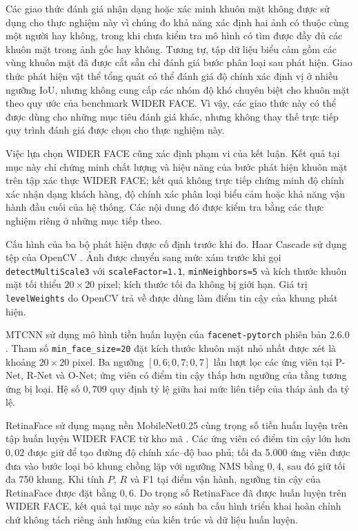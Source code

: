 \documentclass[../LuanVan.tex]{subfiles}
\begin{document}
Các giao thức đánh giá nhận dạng hoặc xác minh khuôn mặt không được sử dụng cho thực nghiệm này vì chúng đo khả năng xác định hai ảnh có thuộc cùng một người hay không, trong khi chưa kiểm tra mô hình có tìm được đầy đủ các khuôn mặt trong ảnh gốc hay không. Tương tự, tập dữ liệu biểu cảm gồm các vùng khuôn mặt đã được cắt sẵn chỉ đánh giá bước phân loại sau phát hiện. Giao thức phát hiện vật thể tổng quát có thể đánh giá độ chính xác định vị ở nhiều ngưỡng IoU, nhưng không cung cấp các nhóm độ khó chuyên biệt cho khuôn mặt theo quy ước của benchmark WIDER FACE. Vì vậy, các giao thức này có thể được dùng cho những mục tiêu đánh giá khác, nhưng không thay thế trực tiếp quy trình đánh giá được chọn cho thực nghiệm này.

Việc lựa chọn WIDER FACE cũng xác định phạm vi của kết luận. Kết quả tại mục này chỉ chứng minh chất lượng và hiệu năng của bước phát hiện khuôn mặt trên tập xác thực WIDER FACE; kết quả không trực tiếp chứng minh độ chính xác nhận dạng khách hàng, độ chính xác phân loại biểu cảm hoặc khả năng vận hành đầu cuối của hệ thống. Các nội dung đó được kiểm tra bằng các thực nghiệm riêng ở những mục tiếp theo.

Cấu hình của ba bộ phát hiện được cố định trước khi đo. Haar Cascade sử dụng tệp  của OpenCV \cite{opencvHaar}. Ảnh được chuyển sang mức xám trước khi gọi \texttt{detectMultiScale3} với \texttt{scaleFactor=1.1}, \texttt{minNeighbors=5} và kích thước khuôn mặt tối thiểu $20\times20$ pixel; kích thước tối đa không bị giới hạn. Giá trị \texttt{levelWeights} do OpenCV trả về được dùng làm điểm tin cậy của khung phát hiện.

MTCNN sử dụng mô hình tiền huấn luyện của \texttt{facenet-pytorch} phiên bản 2.6.0 \cite{facenetPytorch}. Tham số \texttt{min\_face\_size=20} đặt kích thước khuôn mặt nhỏ nhất được xét là khoảng $20\times20$ pixel. Ba ngưỡng $[0{,}6;0{,}7;0{,}7]$ lần lượt lọc các ứng viên tại P-Net, R-Net và O-Net; ứng viên có điểm tin cậy thấp hơn ngưỡng của tầng tương ứng bị loại. Hệ số $0{,}709$ quy định tỷ lệ giữa hai mức liên tiếp của tháp ảnh đa tỷ lệ.

RetinaFace sử dụng mạng nền MobileNet0.25 cùng trọng số tiền huấn luyện trên tập huấn luyện WIDER FACE từ kho mã  \cite{pytorchRetinaface}. Các ứng viên có điểm tin cậy lớn hơn $0{,}02$ được giữ để tạo đường độ chính xác--độ bao phủ; tối đa 5.000 ứng viên được đưa vào bước loại bỏ khung chồng lặp với ngưỡng NMS bằng $0{,}4$, sau đó giữ tối đa 750 khung. Khi tính $P$, $R$ và F1 tại điểm vận hành, ngưỡng tin cậy của RetinaFace được đặt bằng $0{,}6$. Do trọng số RetinaFace đã được huấn luyện trên WIDER FACE, kết quả tại mục này so sánh ba cấu hình triển khai hoàn chỉnh chứ không tách riêng ảnh hưởng của kiến trúc và dữ liệu huấn luyện.
\end{document}
